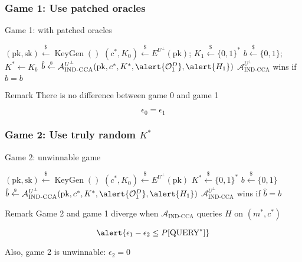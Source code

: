 \documentclass{beamer}
\newcommand{\leftsample}{\overset{{\scriptscriptstyle\$}}{\leftarrow}}
\begin{document}
\begin{frame}
    \frametitle{Game 1: Use patched oracles}

    \begin{algorithm}[H]
        \SetAlgoLined
        \caption{Game 1: with patched oracles}
        $(\text{pk}, \text{sk}) \leftsample \operatorname{KeyGen}()$\;
        $(c^\ast, K_0) \leftsample E^{U^\bot}(\text{pk})$;
        $K_1 \leftsample \{0, 1\}^\ast$\;
        $b \leftsample\{0,1\}$;
        $K^\ast \leftarrow K_b$\;
        $\hat{b} \leftsample \mathcal{A}^{U^\bot}_\text{IND-CCA}(
            \text{pk}, c^\ast, K^\ast, 
            \alert{\mathcal{O}^D_1}, 
            \alert{H_1}
        )$\;
        $\mathcal{A}^{U^\bot}_\text{IND-CCA}$ wins if $\hat{b} = b$
    \end{algorithm}

    \begin{block}{Remark}
        There is no difference between game 0 and game 1

        \begin{equation*}
            \epsilon_0 = \epsilon_1
        \end{equation*}
    \end{block}
\end{frame}

\begin{frame}
    \frametitle{Game 2: Use truly random $K^\ast$}

    \begin{algorithm}[H]
        \SetAlgoLined
        \caption{Game 2: unwinnable game}
        $(\text{pk}, \text{sk}) \leftsample \operatorname{KeyGen}()$\;
        $(c^\ast, K_0) \leftsample E^{U^\bot}(\text{pk})$\;
        \alert{$K^\ast \leftsample \{0, 1\}^\ast$}\;
        $b \leftsample\{0,1\}$\;
        $\hat{b} \leftsample \mathcal{A}^{U^\bot}_\text{IND-CCA}(
            \text{pk}, c^\ast, K^\ast, 
            \alert{\mathcal{O}^D_1}, 
            \alert{H_1}
        )$\;
        $\mathcal{A}^{U^\bot}_\text{IND-CCA}$ wins if $\hat{b} = b$
    \end{algorithm}

    \begin{block}{Remark}
        Game 2 and game 1 diverge when $\mathcal{A}^{}_\text{IND-CCA}$ queries $H$ on $(m^\ast, c^\ast)$

        \begin{equation*}
            \alert{\epsilon_1 - \epsilon_2 \leq P[\text{QUERY}^\ast]}
        \end{equation*}

        Also, game 2 is unwinnable: $\epsilon_2 = 0$
    \end{block}
\end{frame}
\end{document}
